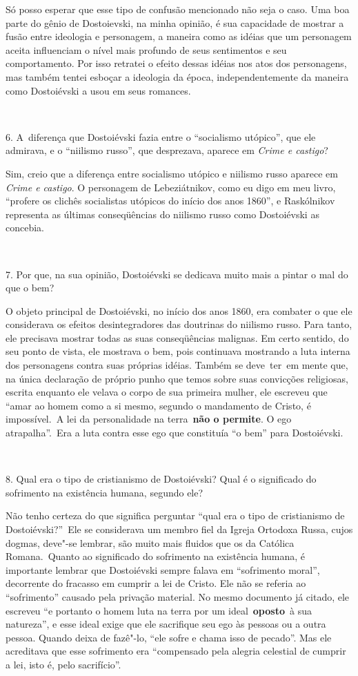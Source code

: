Só posso esperar que esse tipo de confusão mencionado não seja o caso.
Uma boa parte do gênio de Dostoievski, na minha opinião, é sua
capacidade de mostrar a fusão entre ideologia e personagem, a maneira
como as idéias que um personagem aceita influenciam o nível mais
profundo de seus sentimentos e seu comportamento. Por isso retratei o
efeito dessas idéias nos atos dos personagens, mas também tentei esboçar
a ideologia da época, independentemente da maneira como Dostoiévski a
usou em seus romances.

~

6. A~diferença que Dostoiévski fazia entre o ``socialismo utópico'', que
ele admirava, e o ``niilismo russo'', que desprezava, aparece em \emph{Crime e
castigo}?

Sim, creio que a diferença entre socialismo utópico e niilismo russo
aparece em \emph{Crime e castigo}. O personagem de Lebeziátnikov, como eu
digo em meu livro, ``profere os clichês socialistas utópicos do início
dos anos 1860'', e Raskólnikov representa as últimas conseqüências do
niilismo russo como Dostoiévski as concebia.

~

7. Por que, na sua opinião, Dostoiévski se dedicava muito mais a pintar
o mal do que o bem?

O objeto principal de Dostoiévski, no início dos anos 1860, era combater
o que ele considerava os efeitos desintegradores das doutrinas do
niilismo russo. Para tanto, ele precisava mostrar todas as suas
conseqüências malignas. Em certo sentido, do seu ponto de vista, ele
mostrava o bem, pois continuava mostrando a luta interna dos personagens
contra suas próprias idéias. Também se deve~ter~em mente que, na única
declaração de próprio punho que temos sobre suas convicções religiosas,
escrita enquanto ele velava o corpo de sua primeira mulher, ele escreveu
que ``amar ao homem como a si mesmo, segundo o mandamento de Cristo, é
impossível.~A lei da personalidade na terra~\textbf{não o permite}. O
ego atrapalha''.~Era a luta contra esse ego que constituía ``o bem'' para
Dostoiévski.

~

8. Qual era o tipo de cristianismo de Dostoiévski? Qual é o significado
do sofrimento na existência humana, segundo ele?

Não tenho certeza do que significa perguntar ``qual era o tipo de
cristianismo de Dostoiévski?''~Ele se considerava um membro fiel da
Igreja Ortodoxa Russa, cujos dogmas, deve"-se lembrar, são muito mais
fluidos que os da Católica Romana.~Quanto ao significado do sofrimento
na existência humana, é importante lembrar que Dostoiévski sempre falava
em ``sofrimento moral'', decorrente do fracasso em cumprir a lei de
Cristo. Ele não se referia ao ``sofrimento'' causado pela privação
material. No mesmo documento já citado, ele escreveu ``e portanto o homem
luta na terra por um ideal~{\textbf{oposto}~}à sua natureza'', e esse
ideal exige que ele sacrifique seu ego às pessoas ou a outra pessoa.
Quando deixa de fazê"-lo, ``ele sofre e chama isso de pecado''. Mas ele
acreditava que esse sofrimento era ``compensado pela alegria celestial de
cumprir a lei, isto é, pelo sacrifício''.


